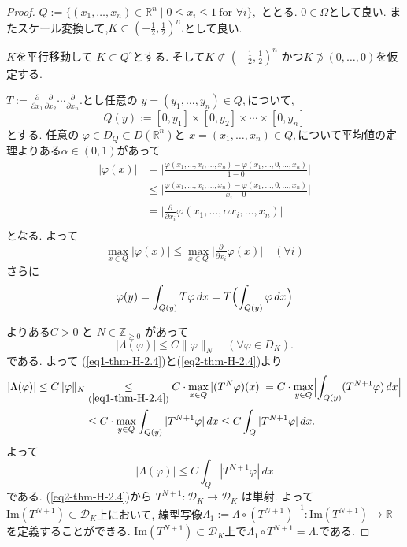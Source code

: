 \documentclass[dvipdfmx,a4paper,11pt]{article} %
\theoremstyle{definition}
\theoremstyle{remark}
\numberwithin{equation}{section}
\begin{document}
\begin{proof}
\(
Q := \{ (x_1,\ldots,x_n) \in \mathbb{R}^n \mid 0 \leq x_i \leq 1 \ \text{for } \forall i \},
\)
ととる. $0 \in\Omega$として良い. 
またスケール変換して,\(K \subset (-\tfrac{1}{2},\tfrac{1}{2})^n.\)として良い. 

$K$を平行移動して  $K \subset Q^\circ$とする. 
そして\(K \not\subset (-\tfrac{1}{2},\tfrac{1}{2})^n\) かつ\(K \not\ni (0,\ldots,0)\)を仮定する. 

\(
T := \frac{\partial}{\partial x_1}\frac{\partial}{\partial x_2}\cdots \frac{\partial}{\partial x_n}.
\)とし任意の \(y=(y_1,\ldots,y_n)\in Q,\)について, 
\[
 Q(y) := [0,y_1] \times [0,y_2] \times \cdots \times [0,y_n]
 \]
とする. 
任意の \(\varphi \in D_{Q} \subset D(\mathbb{R}^n)\)と \(x=(x_1,\ldots,x_n)\in Q,\)について平均値の定理よりある\(\alpha \in (0,1)\)があって
\begin{align*}
|\varphi(x)|
&=
\biggl| \frac{\varphi(x_1,\ldots,x_i,\ldots,x_n) - \varphi(x_1,\ldots,0,\ldots,x_n)}{1- 0} \biggr| \\
&\le \biggl| \frac{\varphi(x_1,\ldots,x_i,\ldots,x_n) - \varphi(x_1,\ldots,0,\ldots,x_n)}{x_i - 0} \biggr| \\
&= \biggl| \frac{\partial}{\partial x_i} \varphi(x_1,\ldots,\alpha x_i,\ldots,x_n) \biggr| \\
\end{align*}
となる. 
よって
\begin{equation}
\label{eq1-thm-H-2.4}
 \max_{x \in Q} |\varphi(x)| \leq \max_{x \in Q} \bigl| \tfrac{\partial}{\partial x_i}\varphi(x)\bigr| \quad (\forall i)
 \end{equation}
さらに
\begin{equation}
\label{eq2-thm-H-2.4}
\varphi(y) = \int_{Q(y)} T\varphi \, dx = T\Bigl( \int_{Q(y)} \varphi \, dx \Bigr) 
\end{equation}

\cite[Thm 6.8]{Rud}よりある\(C>0\) と \( N \in \mathbb{Z}_{\geq 0}\) があって
\[
|\Lambda(\varphi)| \leq C \|\varphi\|_N \quad (\forall \varphi \in D_K).
\]
である. よって
(\ref{eq1-thm-H-2.4})と(\ref{eq2-thm-H-2.4})より
\begin{align*}
|\Lambda(\varphi)| 
\leq C \|\varphi\|_N 
& \underset{(\ref{eq1-thm-H-2.4} )}{\leq} C \cdot \max_{x \in Q} |(T^N \varphi)(x)| 
= C \cdot \max_{y \in Q} \Bigl| \int_{Q(y)} (T^{N+1}\varphi)\, dx \Bigr| \\
&\leq C \cdot \max_{y \in Q} \int_{Q(y)} |T^{N+1}\varphi| \, dx 
\leq C \int_Q |T^{N+1}\varphi| \, dx.
\end{align*}
よって
\begin{equation}
\label{eq3-thm-H-2.4}
|\Lambda(\varphi)| \leq C \int_Q |T^{N+1}\varphi| \, dx
\end{equation}
である. 
(\ref{eq2-thm-H-2.4})から \(T^{N+1} : \mathcal{D}_K \to \mathcal{D}_K\) は単射.
よって$\mathrm{Im}(T^{N+1}) \subset \mathcal{D}_K$上において, 
線型写像\(\Lambda_1 := \Lambda \circ (T^{N+1})^{-1} : \mathrm{Im}(T^{N+1})  \to \mathbb{R}\)を定義することができる. 
$\mathrm{Im}(T^{N+1}) \subset \mathcal{D}_K$上で\(\Lambda_1 \circ T^{N+1} = \Lambda.\)である. 


\end{proof}
\end{document}
